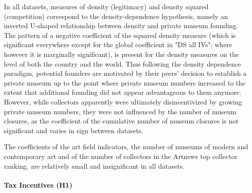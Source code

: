 \documentclass[11pt]{article}
\begin{document}
In all datasets,  measures of density (legitimacy) and density squared (competition) correspond to the density-dependence hypothesis, namely an inverted U-shaped relationship between density and private museum founding.
The pattern of a negative coefficient of the squared density measure (which is significant everywhere except for the global coefficient in "DS all IVs"; where however it is marginally significant), is present for the density measures on the level of both the country and the world.
Thus following the density dependence paradigm, potential founders are motivated by their peers' decision to establish a private museum up to the point where private museum numbers increased to the extent that additional founding did not appear advantageous to them anymore. 
However, while collectors apparently were ultimately disincentivized by growing private museum numbers, they were not influenced by the number of museum closures, as the coefficient of the cumulative number of museum closures is not significant and varies in sign between datasets.







The coefficients of the art field indicators, the number of museums of modern and contemporary art and of the number of collectors in the Artnews top collector ranking, are relatively small and insignificant in all datasets.


\paragraph*{Tax Incentives (H1)}
\end{document}
